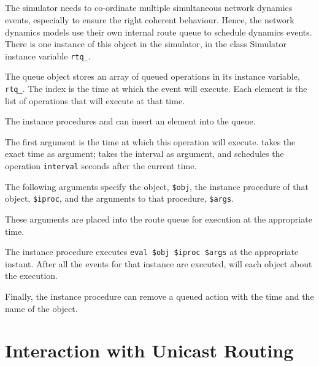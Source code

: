 \subsection{\protect{}}
\label{sec:rtqueue}

The simulator needs to co-ordinate multiple simultaneous network
dynamics events, especially to ensure the right coherent behaviour.
Hence, the network dynamics models use their own internal 
route queue to schedule dynamics events.
There is one instance of this object in the simulator, in the
class Simulator instance variable {\tt rtq\_}.

The queue object stores an array of queued operations
in its instance variable, {\tt rtq\_}.
The index is the time at which the event will execute.
Each element is the list of operations that will execute at that time.

The instance procedures
 and
can insert an element into the queue.
\begin{list}{}{}
\item The first argument is the time at which this operation will execute.
   takes the exact time as argument;
   takes the interval as argument, and schedules the
  operation {\tt interval} seconds after the current time.
\item The following arguments specify the object, {\tt \$obj},
  the instance procedure of that object, {\tt \$iproc},
  and the arguments to that procedure, {\tt \$args}.

  These arguments are placed into the route queue
  for execution at the appropriate time.
\end{list}

The instance procedure
executes {\tt eval \$obj \$iproc \$args} at the appropriate instant.
After all the events for that instance are executed,
 will  each object about the execution.

Finally, the instance procedure
can remove a queued action with the time and the name of the object.

\section{Interaction with Unicast Routing}
\label{sec:unicast-int}


